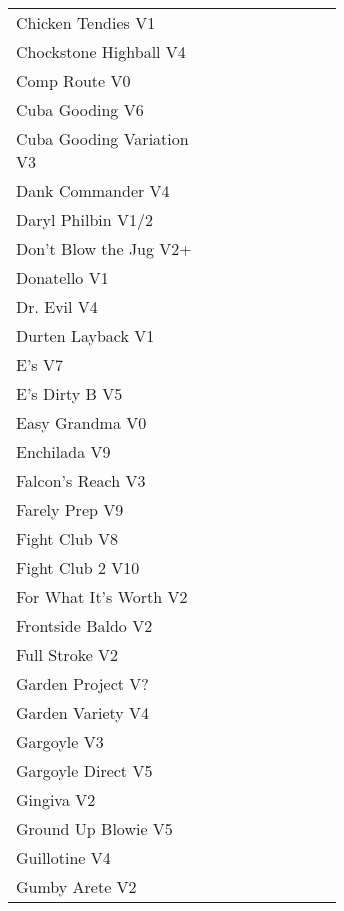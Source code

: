 \begin{flushleft}
\begin{center}
\begin{supertabular}{p{0.65\linewidth}r}
Chicken Tendies V1 & \pageref{rt:Chicken Tendies} \\
Chockstone Highball V4 & \pageref{rt:Chockstone Highball} \\
Comp Route V0 & \pageref{rt:Comp Route} \\
Cuba Gooding V6 & \pageref{rt:Cuba Gooding} \\
Cuba Gooding Variation V3 & \pageref{vr:Cuba Gooding Variation} \\
Dank Commander V4 & \pageref{rt:Dank Commander} \\
Daryl Philbin V1/2 & \pageref{rt:Daryl Philbin} \\
Don't Blow the Jug V2+ & \pageref{rt:Don't Blow the Jug} \\
Donatello V1 & \pageref{rt:Donatello} \\
Dr. Evil V4 & \pageref{rt:Dr. Evil} \\
Durten Layback V1 & \pageref{rt:Durten Layback} \\
E's V7 & \pageref{rt:E's} \\
E's Dirty B V5 & \pageref{rt:E's Dirty B} \\
Easy Grandma V0 & \pageref{rt:Easy Grandma} \\
Enchilada V9 & \pageref{rt:Enchilada} \\
Falcon's Reach V3 & \pageref{rt:Falcon's Reach} \\
Farely Prep V9 & \pageref{rt:Farely Prep} \\
Fight Club V8 & \pageref{rt:Fight Club} \\
Fight Club 2 V10 & \pageref{rt:Fight Club 2} \\
For What It's Worth V2 & \pageref{rt:For What It's Worth} \\
Frontside Baldo V2 & \pageref{rt:Frontside Baldo} \\
Full Stroke V2 & \pageref{rt:Full Stroke} \\
Garden Project V? & \pageref{rt:Garden Project} \\
Garden Variety V4 & \pageref{rt:Garden Variety} \\
Gargoyle V3 & \pageref{rt:Gargoyle} \\
Gargoyle Direct V5 & \pageref{vr:Gargoyle Direct} \\
Gingiva V2 & \pageref{rt:Gingiva} \\
Ground Up Blowie V5 & \pageref{rt:Ground Up Blowie} \\
Guillotine V4 & \pageref{rt:Guillotine} \\
Gumby Arete V2 & \pageref{rt:Gumby Arete} \\

\end{supertabular}
\end{center}
\end{flushleft}
